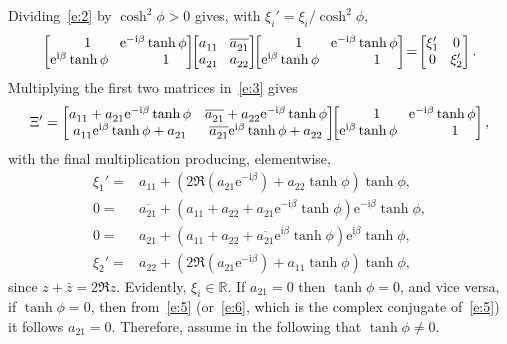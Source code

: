 \documentclass[a4paper,12pt,twoside]{article}
\begin{document}
Dividing~\eqref{e:2} by $\cosh^2\phi>0$ gives, with
$\xi_i'=\xi_i^{}/\cosh^2\phi$,
\begin{equation}
  \begin{bmatrix}
  \hphantom{\mathrm{e}^{\mathrm{i}\beta}}1 & \!\mathrm{e}^{-\mathrm{i}\beta}\tanh\phi\\
  \mathrm{e}^{\mathrm{i}\beta}\tanh\phi & \!\hphantom{\mathrm{e}^{-\mathrm{i}\beta}}1
  \end{bmatrix}\!\!\begin{bmatrix}
  a_{11}^{} & \!\overline{a_{21}^{}}\\
  a_{21}^{} & \!a_{22}^{}
  \end{bmatrix}\!\!\begin{bmatrix}
  \hphantom{\mathrm{e}^{\mathrm{i}\beta}}1 & \!\mathrm{e}^{-\mathrm{i}\beta}\tanh\phi\\
  \mathrm{e}^{\mathrm{i}\beta}\tanh\phi & \!\hphantom{\mathrm{e}^{-\mathrm{i}\beta}}1
  \end{bmatrix}\!=\!\begin{bmatrix}
  \xi_1' & \!0\\
  0 & \!\xi_2'
  \end{bmatrix}.
  \label{e:3}
\end{equation}
Multiplying the first two matrices in~\eqref{e:3} gives
\begin{displaymath}
  \Xi'=\begin{bmatrix}
  a_{11}^{}+a_{21}^{}\mathrm{e}^{-\mathrm{i}\beta}\tanh\phi & \overline{a_{21}^{}}+a_{22}^{}\mathrm{e}^{-\mathrm{i}\beta}\tanh\phi\\
  a_{11}^{}\mathrm{e}^{\mathrm{i}\beta}\tanh\phi+a_{21}^{} & \overline{a_{21}^{}}\mathrm{e}^{\mathrm{i}\beta}\tanh\phi+a_{22}^{}
  \end{bmatrix}\!\!\begin{bmatrix}
  \hphantom{\mathrm{e}^{\mathrm{i}\beta}}1 & \!\mathrm{e}^{-\mathrm{i}\beta}\tanh\phi\\
  \mathrm{e}^{\mathrm{i}\beta}\tanh\phi & \!\hphantom{\mathrm{e}^{-\mathrm{i}\beta}}1
  \end{bmatrix},
\end{displaymath}
with the final multiplication producing, elementwise,
\begin{eqnarray}
    \xi_1'=&a_{11}^{}+(2\Re(a_{21}^{}\mathrm{e}^{-\mathrm{i}\beta})+a_{22}^{}\tanh\phi)\tanh\phi,\label{e:4}\\
    0=&\overline{a_{21}^{}}+(a_{11}^{}+a_{22}^{}+a_{21}^{}\mathrm{e}^{-\mathrm{i}\beta}\tanh\phi)\mathrm{e}^{-\mathrm{i}\beta}\tanh\phi,\label{e:5}\\
    0=&a_{21}^{}+(a_{11}^{}+a_{22}^{}+\overline{a_{21}^{}}\mathrm{e}^{\mathrm{i}\beta}\tanh\phi)\mathrm{e}^{\mathrm{i}\beta}\tanh\phi,\label{e:6}\\
    \xi_2'=&a_{22}^{}+(2\Re(a_{21}^{}\mathrm{e}^{-\mathrm{i}\beta})+a_{11}^{}\tanh\phi)\tanh\phi,\label{e:7}
\end{eqnarray}
since $z+\bar{z}=2\Re{z}$.  Evidently, $\xi_i\in\mathbb{R}$.  If
$a_{21}=0$ then $\tanh\phi=0$, and vice versa, if $\tanh\phi=0$, then
from~\eqref{e:5} (or~\eqref{e:6}, which is the complex conjugate
of~\eqref{e:5}) it follows $a_{21}=0$.  Therefore, assume in the
following that $\tanh\phi\ne 0$.
\end{document}
